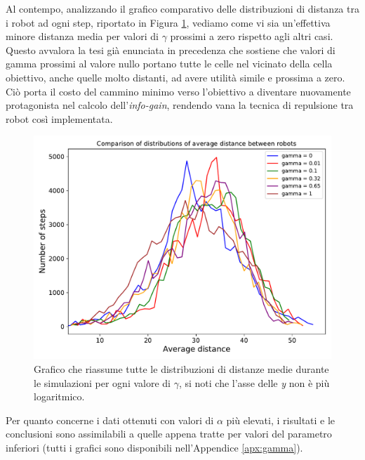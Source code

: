 Al contempo, analizzando il grafico comparativo delle distribuzioni di distanza tra i robot ad ogni step, riportato in Figura \ref{fig:NgammaLComparison}, vediamo come vi sia un'effettiva minore distanza media per valori di $\gamma$ prossimi a zero rispetto agli altri casi. Questo avvalora la tesi già enunciata in precedenza che sostiene che valori di gamma prossimi al valore nullo portano tutte le celle nel vicinato della cella obiettivo, anche quelle molto distanti, ad avere utilità simile e prossima a zero. Ciò porta il costo del cammino minimo verso l'obiettivo a diventare nuovamente protagonista nel calcolo dell'\textit{info-gain}, rendendo vana la tecnica di repulsione tra robot così implementata.
\begin{figure}
	\centering
	\includegraphics[width=0.9\linewidth]{images/high_priority_gamma_results/low_alpha/comparison}
	\caption{Grafico che riassume tutte le distribuzioni di distanze medie durante le simulazioni per ogni valore di $\gamma$, si noti che l'asse delle \textit{y} non è più logaritmico.}
	\label{fig:NgammaLComparison}
\end{figure}
Per quanto concerne i dati ottenuti con valori di $\alpha$ più elevati, i risultati e le conclusioni sono assimilabili a quelle appena tratte per valori del parametro inferiori (tutti i grafici sono disponibili nell'Appendice \ref{apx:gamma}).
